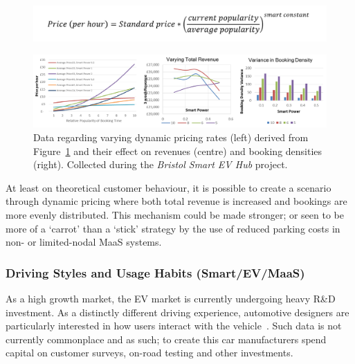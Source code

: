 \documentclass[b5paper,10pt]{article}
\begin{document}
\begin{figure}[htb]
\centering
\includegraphics[width=0.75\columnwidth]{images/smartpricingformula.png}
\label{fig:smartpricingformula}
\end{figure}

\begin{figure}[htb]
\centering
\includegraphics[width=\textwidth]{images/smartpricegraphs.png}
\caption{Data regarding varying dynamic pricing rates (left) derived
from Figure~\ref{fig:smartpricingformula} and their effect on revenues
(centre) and booking densities (right). Collected during the
{\emph{Bristol Smart EV Hub}} project.}
\label{fig:smartpricegraphs}
\end{figure}


At least on theoretical customer behaviour, it is possible to create a
scenario through dynamic pricing where both total revenue is increased
and bookings are more evenly distributed. This mechanism could be made
stronger; or seen to be more of a `carrot' than a `stick' strategy by
the use of reduced parking costs in non- or limited-nodal MaaS
systems.

\subsubsection{Driving Styles and Usage Habits (Smart/EV/MaaS)} 

As a high growth market, the EV market is currently undergoing heavy
R\&D investment. As a distinctly different driving experience,
automotive designers are particularly interested in how users interact
with the vehicle~\citep{ferreira-et-al:2013}. Such data is not
currently commonplace and as such; to create this car manufacturers
spend capital on customer surveys, on-road testing and other
investments.
\end{document}
